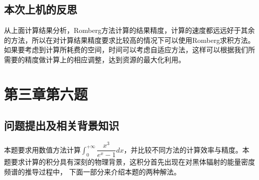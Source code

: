 \documentclass[10pt,a4paper]{ctexart}
\begin{document}
\subsection{本次上机的反思}
从上面计算结果分析，Romberg方法计算的结果精度，计算的速度都远远好于其余的方法，所以在对计算结果精度要求比较高的情况下可以使用Romberg求积方法。如果要考虑到计算所耗费的空间，时间可以考虑自适应方法，这样可以根据我们所需要的精度做计算上的相应调整，达到资源的最大化利用。
\section{第三章第六题}
\subsection{问题提出及相关背景知识}
本题要求用数值方法计算$\int_{0}^{+\infty}\dfrac{x^3}{e^x-1}dx$，并比较不同方法的计算效率与精度。本题要求计算的积分具有深刻的物理背景，这积分首先出现在对黑体辐射的能量密度频谱的推导过程中，
下面一部分来介绍本题的两种解法。
\end{document}
